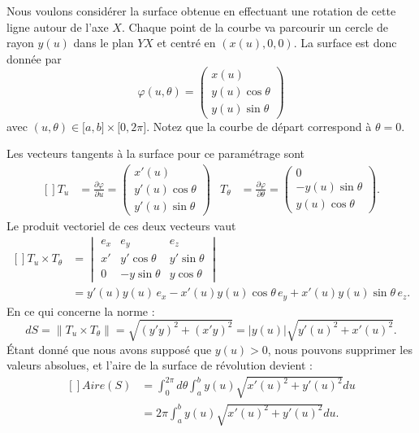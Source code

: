 Nous voulons considérer la surface obtenue en effectuant une rotation de cette ligne autour de l'axe $X$. Chaque point de la courbe va parcourir un cercle de rayon $y(u)$ dans le plan $YX$ et centré en $(x(u),0,0)$. La surface est donc donnée par
\begin{equation}
	\varphi(u,\theta)=\begin{pmatrix}
		x(u)           \\
		y(u)\cos\theta \\
		y(u)\sin\theta
	\end{pmatrix}
\end{equation}
avec $(u,\theta)\in\mathopen[ a , b \mathclose]\times \mathopen[ 0 , 2\pi \mathclose]$. Notez que la courbe de départ correspond à $\theta=0$.

Les vecteurs tangents à la surface pour ce paramétrage sont
\begin{equation}
	\begin{aligned}[]
		T_u        & =\frac{ \partial \varphi }{ \partial u }=\begin{pmatrix}
			x'(u)           \\
			y'(u)\cos\theta \\
			y'(u)\sin\theta
		\end{pmatrix}       &
		T_{\theta} & =\frac{ \partial \varphi }{ \partial \theta }=\begin{pmatrix}
			0               \\
			-y(u)\sin\theta \\
			y(u)\cos\theta
		\end{pmatrix}.
	\end{aligned}
\end{equation}
Le produit vectoriel de ces deux vecteurs vaut
\begin{equation}
	\begin{aligned}[]
		T_u\times T_{\theta} & =\begin{vmatrix}
			e_x & e_y          & e_z          \\
			x'  & y'\cos\theta & y'\sin\theta \\
			0   & -y\sin\theta & y\cos\theta
		\end{vmatrix}                                          \\
		                     & =y'(u)y(u)\,e_x-x'(u)y(u)\cos\theta\, e_y+x'(u)y(u)\sin\theta\, e_z.
	\end{aligned}
\end{equation}
En ce qui concerne la norme :
\begin{equation}
	dS=\| T_u\times T_{\theta} \|=\sqrt{(y'y)^2+(x'y)^2}=| y(u) |\sqrt{y'(u)^2+x'(u)^2}.
\end{equation}
Étant donné que nous avons supposé que $y(u)>0$, nous pouvons supprimer les valeurs absolues, et l'aire de la surface de révolution devient :
\begin{equation}
	\begin{aligned}[]
		Aire(S) & =\int_0^{2\pi}d\theta\int_a^b y(u)\sqrt{x'(u)^2+y'(u)^2}du \\
		        & =2\pi\int_a^b y(u)\sqrt{x'(u)^2+y'(u)^2}du.
	\end{aligned}
\end{equation}

